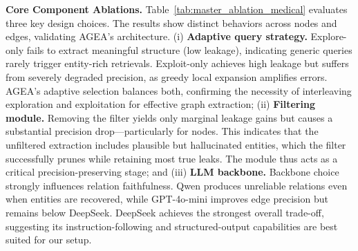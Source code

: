 \noindent\textbf{Core Component Ablations.}
Table~\ref{tab:master_ablation_medical} evaluates three key design choices. The results show distinct behaviors across nodes and edges, validating AGEA's architecture. (i) \textbf{Adaptive query strategy.}
    Explore-only fails to extract meaningful structure (low leakage), indicating generic queries rarely trigger entity-rich retrievals. Exploit-only achieves high leakage but suffers from severely degraded precision, as greedy local expansion amplifies errors. AGEA's adaptive selection balances both, confirming the necessity of interleaving exploration and exploitation for effective graph extraction; (ii) \textbf{Filtering module.}
    Removing the filter yields only marginal leakage gains but causes a substantial precision drop—particularly for nodes. This indicates that the unfiltered extraction includes plausible but hallucinated entities, which the filter successfully prunes while retaining most true leaks. The module thus acts as a critical precision-preserving stage; and (iii) \textbf{LLM backbone.}
    Backbone choice strongly influences relation faithfulness. Qwen produces unreliable relations even when entities are recovered, while GPT-4o-mini improves edge precision but remains below DeepSeek. DeepSeek achieves the strongest overall trade-off, suggesting its instruction-following and structured-output capabilities are best suited for our setup.


